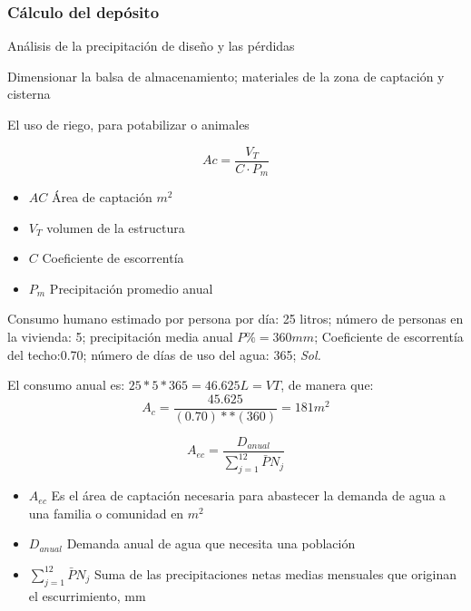 \subsubsection{Cálculo del depósito}
\begin{definition}
    Análisis de la precipitación de diseño y las pérdidas
\end{definition}
\begin{definition}
    Dimensionar la balsa de almacenamiento; materiales de la zona de captación y cisterna
\end{definition}
\begin{definition}
    El uso de riego, para potabilizar o animales
\end{definition}
\begin{equation}
    Ac = \frac{V_T}{C \cdot P_m}
\end{equation}
\begin{notation}
\begin{itemize}
    \item $AC$ Área de captación $m^2$
    \item $V_T$ volumen de la estructura
    \item $C$ Coeficiente de escorrentía
    \item $P_m$ Precipitación promedio anual
\end{itemize}
\end{notation}
\begin{example}
    Consumo humano estimado por persona por día: 25 litros; número de personas en la vivienda: 5; precipitación media anual $P\%=360mm$; Coeficiente de escorrentía del techo:0.70; número de días de uso del agua: 365;
    \textit{ Sol. }

    El consumo anual es: $25*5*365=46.625L=VT$, de manera que:
    \begin{equation*}
        A_c=\frac{45.625}{\left(0.70\right)**\left(360\right)}=181m^2
    \end{equation*}
\end{example}
\begin{equation}
    A_{ec} =\frac{D_{anual}}{\sum_{j = 1}^{12}\bar{P}N_j}
\end{equation}
\begin{notation}
\begin{itemize}
    \item $A_{ec}$ Es el área de captación necesaria para abastecer la demanda de agua a una familia o comunidad en $m^2$
    \item $D_{anual}$ Demanda anual de agua que necesita una población
    \item $\sum_{j = 1}^{12}\bar{P}N_j$ Suma de las precipitaciones netas medias mensuales que originan el escurrimiento, mm
\end{itemize}
\end{notation}
